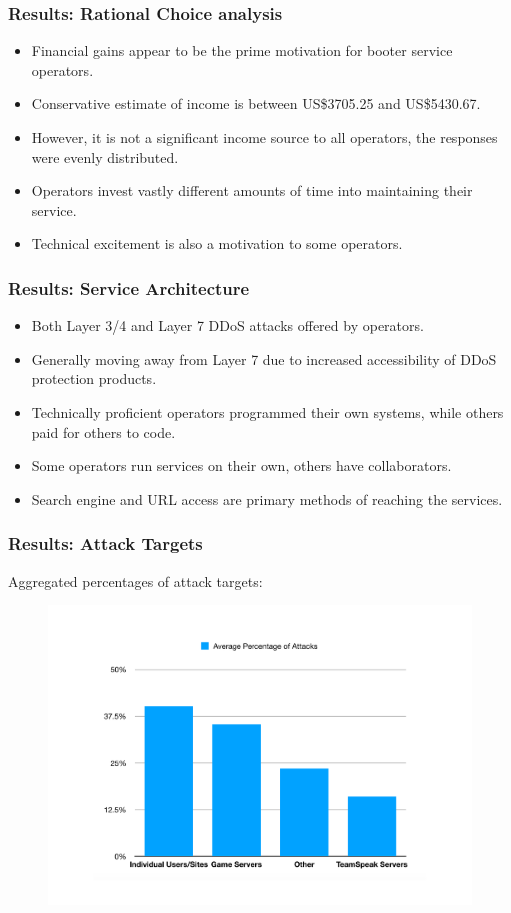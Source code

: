\documentclass[aspectratio=1610]{beamer}
\begin{document}
\begin{frame}
\frametitle{Results: Rational Choice analysis}
\begin{itemize}
\setlength\itemsep{1em}
\item Financial gains appear to be the prime motivation for booter service operators.
\item Conservative estimate of income is between US\$3705.25 and US\$5430.67.
\item However, it is not a significant income source to all operators, the responses were evenly distributed.
\item Operators invest vastly different amounts of time into maintaining their service.
\item Technical excitement is also a motivation to some operators.
\end{itemize}
\end{frame}

\begin{frame}
\frametitle{Results: Service Architecture}
\begin{itemize}
\setlength\itemsep{1em}
\item Both Layer 3/4 and Layer 7 DDoS attacks offered by operators.
\item Generally moving away from Layer 7 due to increased accessibility of DDoS protection products.
\item Technically proficient operators programmed their own systems, while others paid for others to code.
\item Some operators run services on their own, others have collaborators.
\item Search engine and URL access are primary methods of reaching the services. 
\end{itemize}
\end{frame}

\begin{frame}
\frametitle{Results: Attack Targets}
\vspace{1em}
Aggregated percentages of attack targets: \par
\begin{figure}
\centering
\includegraphics[scale=0.4]{fig2.pdf}
\end{figure}
\end{frame}
\end{document}
